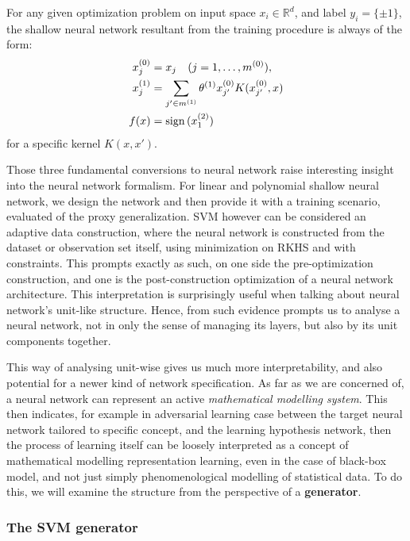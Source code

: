 \begin{setting}
    For any given optimization problem on input space $x_{i}\in \mathbb{R}^{d}$, and label $y_{i}=\{\pm 1\}$, the shallow neural network resultant from the training procedure is always of the form:
    \begin{align}
        x_{j}^{(0)} &= x_{j} \quad (j=1,\dots,m^{(0)}),\\ 
        x_{j}^{(1)} &= \sum_{j'\in m^{(1)}} \theta^{(1)}x_{j'}^{(0)}K(x_{j'}^{(0)},x)\\
        f(x) & = \operatorname{sign}{(x_{1}^{(2)}) }
    \end{align}
    for a specific kernel $K(x,x')$. 
\end{setting}

Those three fundamental conversions to neural network raise interesting insight into the neural network formalism. For linear and polynomial shallow neural network, we design the network and then provide it with a training scenario, evaluated of the proxy generalization. SVM however can be considered an adaptive data construction, where the neural network is constructed from the dataset or observation set itself, using minimization on RKHS and with constraints. This prompts exactly as such, on one side the pre-optimization construction, and one is the post-construction optimization of a neural network architecture. This interpretation is surprisingly useful when talking about neural network's unit-like structure. Hence, from such evidence prompts us to analyse a neural network, not in only the sense of managing its layers, but also by its unit components together. 

This way of analysing unit-wise gives us much more interpretability, and also potential for a newer kind of network specification. As far as we are concerned of, a neural network can represent an active \textit{mathematical modelling system}. This then indicates, for example in adversarial learning case between the target neural network tailored to specific concept, and the learning hypothesis network, then the process of learning itself can be loosely interpreted as a concept of mathematical modelling representation learning, even in the case of black-box model, and not just simply phenomenological modelling of statistical data. To do this, we will examine the structure from the perspective of a \textbf{generator}.

\subsubsection{The SVM generator}

